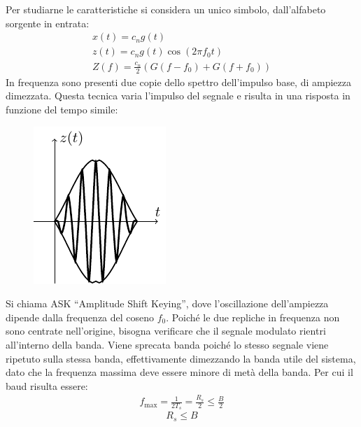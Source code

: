 \documentclass{article}
\numberwithin{equation}{subsection}
\begin{document}
Per studiarne le caratteristiche si considera un unico simbolo, dall'alfabeto sorgente in entrata: 
\begin{gather*}
    x(t)=c_ng(t)\\
    z(t)=c_ng(t)\cos(2\pi f_0t)\\
    Z(f)=\displaystyle\frac{c_n}{2}\left(G(f-f_0)+G(f+f_0)\right)
\end{gather*}
In frequenza sono presenti due copie dello spettro dell'impulso base, di ampiezza dimezzata. 
Questa tecnica varia l'impulso del segnale e risulta in una risposta in funzione del tempo simile:
\begin{figure}[H]%
    \centering
    \includegraphics{ask.pdf}
\end{figure}
Si chiama ASK ``Amplitude Shift Keying'', dove l'oscillazione dell'ampiezza dipende dalla frequenza del coseno $f_0$. 
Poiché le due repliche in frequenza non sono centrate nell'origine, bisogna verificare che il segnale modulato rientri all'interno della banda. Viene sprecata banda poiché 
lo stesso segnale viene ripetuto sulla stessa banda, effettivamente dimezzando la banda utile del sistema, dato che la frequenza massima deve essere minore di metà della banda. 
Per cui il baud risulta essere:
\begin{gather*}
    f_{\max}=\displaystyle\frac{1}{2T_s}=\frac{R_s}{2}\leq\frac{B}{2}
\end{gather*}
\begin{equation}
    R_s\leq B
\end{equation}
\end{document}
